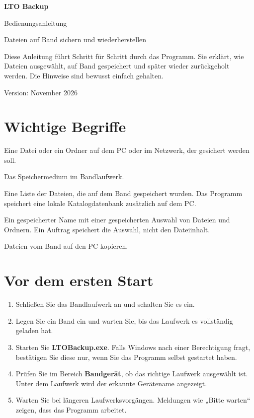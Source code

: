 \documentclass[11pt,a4paper]{article}
\begin{document}
\begin{titlepage}
\centering
\vspace*{2.2cm}
{\Huge\bfseries\color{dunkelblau} LTO Backup\par}
\vspace{.6cm}
{\LARGE Bedienungsanleitung\par}
\vspace{.5cm}
{\large Dateien auf Band sichern und wiederherstellen\par}
\vfill
\begin{minipage}{.82\textwidth}
\colorbox{hellblau}{\parbox{.94\textwidth}{\large
Diese Anleitung führt Schritt für Schritt durch das Programm. Sie erklärt, wie Dateien ausgewählt, auf Band gespeichert und später wieder zurückgeholt werden. Die Hinweise sind bewusst einfach gehalten.}}
\end{minipage}
\vfill
Version: November 2026
\end{titlepage}

\tableofcontents
\newpage

\section{Wichtige Begriffe}
\begin{description}[style=nextline]
\item[Quelle] Eine Datei oder ein Ordner auf dem PC oder im Netzwerk, der gesichert werden soll.
\item[Band] Das Speichermedium im Bandlaufwerk.
\item[Inhaltsverzeichnis oder Katalog] Eine Liste der Dateien, die auf dem Band gespeichert wurden. Das Programm speichert eine lokale Katalogdatenbank zusätzlich auf dem PC.
\item[Sicherungsauftrag] Ein gespeicherter Name mit einer gespeicherten Auswahl von Dateien und Ordnern. Ein Auftrag speichert die Auswahl, nicht den Dateiinhalt.
\item[Zurücksichern] Dateien vom Band auf den PC kopieren.
\end{description}

\section{Vor dem ersten Start}
\begin{enumerate}
\item Schließen Sie das Bandlaufwerk an und schalten Sie es ein.
\item Legen Sie ein Band ein und warten Sie, bis das Laufwerk es vollständig geladen hat.
\item Starten Sie \textbf{LTOBackup.exe}. Falls Windows nach einer Berechtigung fragt, bestätigen Sie diese nur, wenn Sie das Programm selbst gestartet haben.
\item Prüfen Sie im Bereich \textbf{Bandgerät}, ob das richtige Laufwerk ausgewählt ist. Unter dem Laufwerk wird der erkannte Gerätename angezeigt.
\item Warten Sie bei längeren Laufwerksvorgängen. Meldungen wie „Bitte warten“ zeigen, dass das Programm arbeitet.
\end{enumerate}
\end{document}
